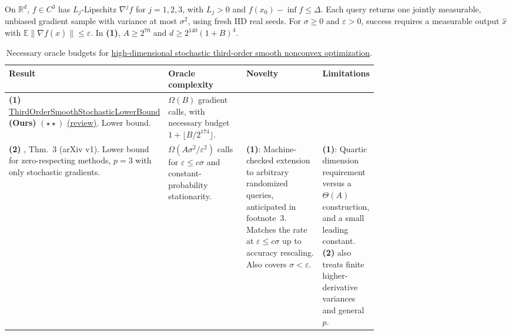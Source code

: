 \begin{table}[tp]
\centering
\caption{Necessary oracle budgets for \href{https://github.com/k3nfalt/longtails/blob/main/LongTails/Setups/HighDimensionalStochasticThirdOrderSmoothNonconvex.lean}{high-dimensional stochastic third-order smooth nonconvex optimization}.}\label{tab:HighDimensionalStochasticThirdOrderSmoothNonconvex}
\parbox{\linewidth}{\footnotesize On $\mathbb R^d$, $f\in C^3$ has $L_j$-Lipschitz $\nabla^j f$ for $j=1,2,3$, with $L_j>0$ and $f(x_0)-\inf f\le\Delta$. Each query returns one jointly measurable, unbiased gradient sample with variance at most $\sigma^2$, using fresh IID real seeds. For $\sigma\ge0$ and $\varepsilon>0$, success requires a measurable output $\widehat x$ with $\mathbb E\|\nabla f(\widehat x)\|\le\varepsilon$. In \textbf{(1)}, $A\ge 2^{70}$ and $d\ge 2^{140}(1+B)^4$.}\par\smallskip
\begin{threeparttable}
\footnotesize
\setlength{\tabcolsep}{4pt}\renewcommand{\arraystretch}{1.25}
\begin{tabularx}{\linewidth}{@{}>{\raggedright\arraybackslash}p{0.23\linewidth}>{\raggedright\arraybackslash}p{0.25\linewidth}>{\raggedright\arraybackslash}p{0.25\linewidth}>{\raggedright\arraybackslash}X@{}}
\toprule
\textbf{Result} & \textbf{Oracle complexity} & \textbf{Novelty} & \textbf{Limitations} \\
\midrule
\textbf{(1)} \href{https://github.com/k3nfalt/longtails/blob/main/LongTails/Theorems/ThirdOrderSmoothStochasticLowerBound.lean}{Third\allowbreak{}Order\allowbreak{}Smooth\allowbreak{}Stochastic\allowbreak{}Lower\allowbreak{}Bound} \textbf{(Ours)} $(\star\star)$ \href{https://github.com/k3nfalt/longtails/blob/main/scripts/reviews/ThirdOrderSmoothStochasticLowerBound.md}{(review)}. Lower bound.
& $\Omega(B)$ gradient calls, with necessary budget $1+\lfloor B/2^{174}\rfloor$. & & \\
\midrule[1.2pt]
\textbf{(2)} \citep{hdThirdArjevaniCOLT2020}, Thm.~3 (arXiv v1). Lower bound for zero-respecting methods, $p=3$ with only stochastic gradients.
& $\Omega(A\sigma^2/\varepsilon^2)$ calls for $\varepsilon\le c\sigma$ and constant-probability stationarity.
& \textbf{(1)}: Machine-checked extension to arbitrary randomized queries, anticipated in footnote~3. Matches the rate at $\varepsilon\le c\sigma$ up to accuracy rescaling. Also covers $\sigma<\varepsilon$.
& \textbf{(1)}: Quartic dimension requirement versus a $\Theta(A)$ construction, and a small leading constant. \textbf{(2)} also treats finite higher-derivative variances and general $p$. \\

\end{tabularx}
\end{threeparttable}
\end{table}
